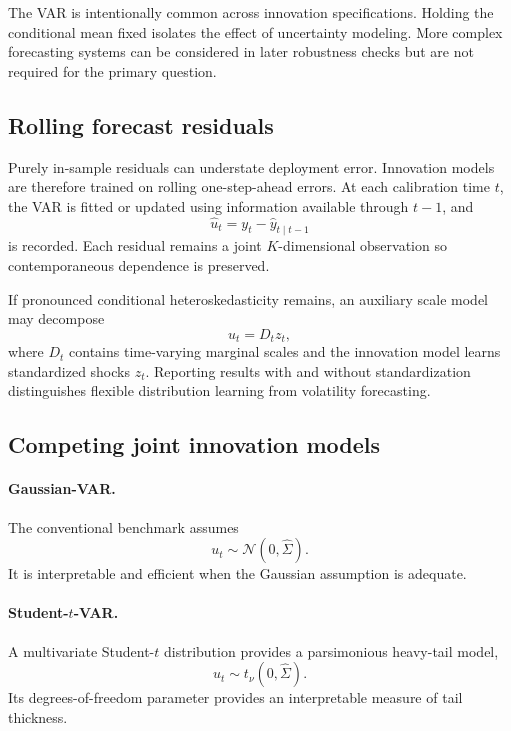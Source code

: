 \documentclass[11pt]{article}
\begin{document}
The VAR is intentionally common across innovation specifications. Holding the conditional mean fixed isolates the effect of uncertainty modeling. More complex forecasting systems can be considered in later robustness checks but are not required for the primary question.

\subsection{Rolling forecast residuals}

Purely in-sample residuals can understate deployment error. Innovation models are therefore trained on rolling one-step-ahead errors. At each calibration time $t$, the VAR is fitted or updated using information available through $t-1$, and
\begin{equation}
    \widehat u_t=y_t-\widehat y_{t\mid t-1}
\end{equation}
is recorded. Each residual remains a joint $K$-dimensional observation so contemporaneous dependence is preserved.

If pronounced conditional heteroskedasticity remains, an auxiliary scale model may decompose
\begin{equation}
    u_t=D_tz_t,
\end{equation}
where $D_t$ contains time-varying marginal scales and the innovation model learns standardized shocks $z_t$. Reporting results with and without standardization distinguishes flexible distribution learning from volatility forecasting.

\subsection{Competing joint innovation models}

\paragraph{Gaussian-VAR.}
The conventional benchmark assumes
\begin{equation}
    u_t\sim\mathcal{N}(0,\widehat\Sigma).
\end{equation}
It is interpretable and efficient when the Gaussian assumption is adequate.

\paragraph{Student-$t$-VAR.}
A multivariate Student-$t$ distribution provides a parsimonious heavy-tail model,
\begin{equation}
    u_t\sim t_{\nu}(0,\widehat\Sigma).
\end{equation}
Its degrees-of-freedom parameter provides an interpretable measure of tail thickness.
\end{document}
